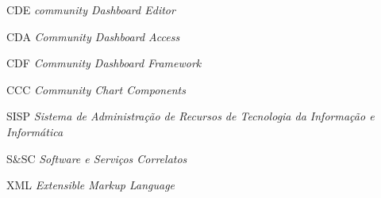 \begin{siglas}
\item [CDE]   \textit{community Dashboard Editor}
\item [CDA]   \textit{Community Dashboard Access}
\item [CDF]   \textit{Community Dashboard Framework}
\item [CCC]   \textit{Community Chart Components}
\item [SISP]   \textit{Sistema de Administração de Recursos de Tecnologia da Informação e Informática}
\item [S\&SC]   \textit{Software e Serviços Correlatos} 
\item [XML]    \textit{Extensible Markup Language}
\end{siglas}
